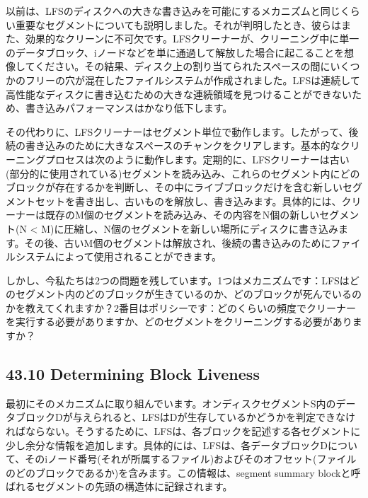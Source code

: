 以前は、LFSのディスクへの大きな書き込みを可能にするメカニズムと同じくらい重要なセグメントについても説明しました。それが判明したとき、彼らはまた、効果的なクリーンに不可欠です。LFSクリーナーが、クリーニング中に単一のデータブロック、iノードなどを単に通過して解放した場合に起こることを想像してください。その結果、ディスク上の割り当てられたスペースの間にいくつかのフリーの穴が混在したファイルシステムが作成されました。LFSは連続して高性能なディスクに書き込むための大きな連続領域を見つけることができないため、書き込みパフォーマンスはかなり低下します。

その代わりに、LFSクリーナーはセグメント単位で動作します。したがって、後続の書き込みのために大きなスペースのチャンクをクリアします。基本的なクリーニングプロセスは次のように動作します。定期的に、LFSクリーナーは古い(部分的に使用されている)セグメントを読み込み、これらのセグメント内にどのブロックが存在するかを判断し、その中にライブブロックだけを含む新しいセグメントセットを書き出し、古いものを解放し、書き込みます。具体的には、クリーナーは既存のM個のセグメントを読み込み、その内容をN個の新しいセグメント(N
\textless{}
M)に圧縮し、N個のセグメントを新しい場所にディスクに書き込みます。その後、古いM個のセグメントは解放され、後続の書き込みのためにファイルシステムによって使用されることができます。

しかし、今私たちは2つの問題を残しています。1つはメカニズムです：LFSはどのセグメント内のどのブロックが生きているのか、どのブロックが死んでいるのかを教えてくれますか？2番目はポリシーです：どのくらいの頻度でクリーナーを実行する必要がありますか、どのセグメントをクリーニングする必要がありますか？

\hypertarget{determining-block-liveness}{%
\subsection*{43.10 Determining Block
Liveness}\label{determining-block-liveness}}

最初にそのメカニズムに取り組んでいます。オンディスクセグメントS内のデータブロックDが与えられると、LFSはDが生存しているかどうかを判定できなければならない。そうするために、LFSは、各ブロックを記述する各セグメントに少し余分な情報を追加します。具体的には、LFSは、各データブロックDについて、そのiノード番号(それが所属するファイル)およびそのオフセット(ファイルのどのブロックであるか)を含みます。この情報は、segment
summary blockと呼ばれるセグメントの先頭の構造体に記録されます。

